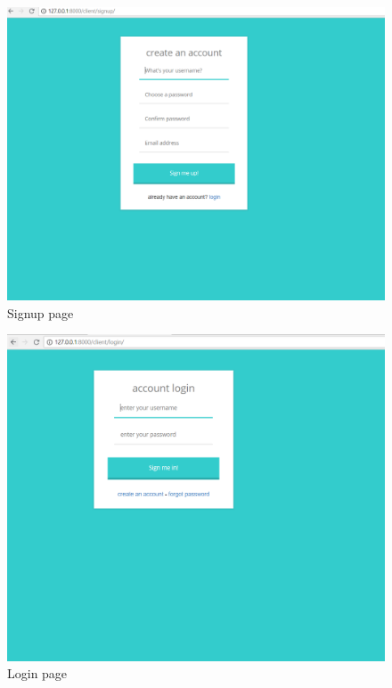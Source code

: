 \documentclass{article}
\begin{document}
\begin{figure}[h]
    \centering
    \includegraphics[scale=0.295]{sign_up.PNG}
    \caption{Signup page}
    \label{fig:Signup page}
\end{figure}

\begin{figure}[h]
    \centering
    \includegraphics[scale=0.295]{log_in.PNG}
    \caption{Login page}
    \label{fig:Login page}
\end{figure}
\end{document}
